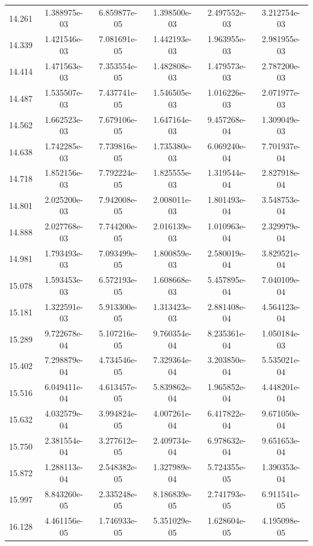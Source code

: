 \documentclass[fleqn,usenatbib]{mnras}
\begin{document}
\begin{table}
\begin{tabular}{c|cc|ccc}
        14.261 & 1.388975e-03 & 6.859877e-05 & 1.398500e-03 & 2.497552e-03 & 3.212754e-03 \\ 
        14.339 & 1.421546e-03 & 7.081691e-05 & 1.442193e-03 & 1.963955e-03 & 2.981955e-03 \\ 
        14.414 & 1.471563e-03 & 7.353554e-05 & 1.482808e-03 & 1.479573e-03 & 2.787200e-03 \\ 
        14.487 & 1.535507e-03 & 7.437741e-05 & 1.546505e-03 & 1.016226e-03 & 2.071977e-03 \\ \hline
        14.562 & 1.662523e-03 & 7.679106e-05 & 1.647164e-03 & 9.457268e-04 & 1.309049e-03 \\ 
        14.638 & 1.742285e-03 & 7.739816e-05 & 1.735380e-03 & 6.069240e-04 & 7.701937e-04 \\ 
        14.718 & 1.852156e-03 & 7.792224e-05 & 1.825555e-03 & 1.319544e-04 & 2.827918e-04 \\ 
        14.801 & 2.025200e-03 & 7.942008e-05 & 2.008011e-03 & 1.801493e-04 & 3.548753e-04 \\ 
        14.888 & 2.027768e-03 & 7.744200e-05 & 2.016139e-03 & 1.010963e-04 & 2.329979e-04 \\ \hline
        14.981 & 1.793493e-03 & 7.093499e-05 & 1.800859e-03 & 2.580019e-04 & 3.829521e-04 \\ 
        15.078 & 1.593453e-03 & 6.572193e-05 & 1.608668e-03 & 5.457895e-04 & 7.040109e-04 \\ 
        15.181 & 1.322591e-03 & 5.913300e-05 & 1.313423e-03 & 2.881408e-04 & 4.564123e-04 \\ 
        15.289 & 9.722678e-04 & 5.107216e-05 & 9.760354e-04 & 8.235361e-04 & 1.050184e-03 \\ 
        15.402 & 7.298879e-04 & 4.734546e-05 & 7.329364e-04 & 3.203850e-04 & 5.535021e-04 \\ \hline
        15.516 & 6.049411e-04 & 4.613457e-05 & 5.839862e-04 & 1.965852e-04 & 4.448201e-04 \\ 
        15.632 & 4.032579e-04 & 3.994824e-05 & 4.007261e-04 & 6.417822e-04 & 9.671050e-04 \\ 
        15.750 & 2.381554e-04 & 3.277612e-05 & 2.409734e-04 & 6.978632e-04 & 9.651653e-04 \\ 
        15.872 & 1.288113e-04 & 2.548382e-05 & 1.327989e-04 & 5.724355e-05 & 1.390353e-04 \\ 
        15.997 & 8.843260e-05 & 2.335248e-05 & 8.186839e-05 & 2.741793e-05 & 6.911541e-05 \\ \hline
        16.128 & 4.461156e-05 & 1.746933e-05 & 5.351029e-05 & 1.628604e-05 & 4.195098e-05 \\ 

\end{tabular}
\end{table}
\end{document}
